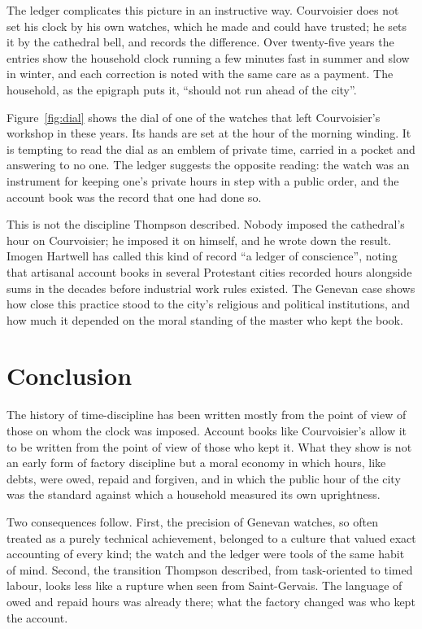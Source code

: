 \documentclass[11pt]{article}
\begin{document}
The ledger complicates this picture in an instructive way. Courvoisier does
not set his clock by his own watches, which he made and could have trusted;
he sets it by the cathedral bell, and records the difference. Over
twenty-five years the entries show the household clock running a few
minutes fast in summer and slow in winter, and each correction is noted
with the same care as a payment. The household, as the epigraph puts it,
\enquote{should not run ahead of the city}.

Figure~\ref{fig:dial} shows the dial of one of the watches that left
Courvoisier's workshop in these years. Its hands are set at the hour of the
morning winding. It is tempting to read the dial as an emblem of private
time, carried in a pocket and answering to no one. The ledger suggests the
opposite reading: the watch was an instrument for keeping one's private
hours in step with a public order, and the account book was the record that
one had done so.

\passagebreak
This is not the discipline Thompson described. Nobody imposed the
cathedral's hour on Courvoisier; he imposed it on himself, and he wrote down
the result. Imogen Hartwell has called this kind of record \enquote{a
ledger of conscience}, noting that artisanal account books in several
Protestant cities recorded hours alongside sums in the decades before
industrial work rules existed.\autocite[309--314]{hartwell2014} The
Genevan case shows how close this practice stood to the city's religious
and political institutions, and how much it depended on the moral standing
of the master who kept the book.

\section{Conclusion}

The history of time-discipline has been written mostly from the point of
view of those on whom the clock was imposed. Account books like
Courvoisier's allow it to be written from the point of view of those who
kept it. What they show is not an early form of factory discipline but a
moral economy in which hours, like debts, were owed, repaid and forgiven,
and in which the public hour of the city was the standard against which a
household measured its own uprightness.

Two consequences follow. First, the precision of Genevan watches, so often
treated as a purely technical achievement, belonged to a culture that
valued exact accounting of every kind; the watch and the ledger were tools
of the same habit of mind.\autocite[245]{landes1983} Second, the
transition Thompson described, from task-oriented to timed labour, looks
less like a rupture when seen from Saint-Gervais. The language of owed and
repaid hours was already there; what the factory changed was who kept the
account.\autocite[63--70]{thompson1967}

\printbibliography[title=Bibliography]
\end{document}
